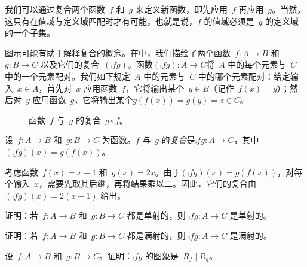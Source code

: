 \documentclass[../../../include/open-logic-section]{subfiles}
\begin{document}

\begin{explain}
我们可以通过复合两个函数~$f$ 和~$g$ 来定义新函数，即先应用~$f$ 再应用~$g$。当然，这只有在值域与定义域匹配时才有可能，也就是说，$f$ 的值域必须是~$g$ 的定义域的一个子集。

图示可能有助于解释复合的概念。在中，我们描绘了两个函数~$f \colon A \to B$ 和~$g \colon B \to C$ 以及它们的复合~$(\comp{f}{g})$。函数$(\comp{f}{g}) \colon A \to C$将~$A$ 中的每个元素与~$C$ 中的一个元素配对。我们如下规定~$A$ 中的元素与~$C$ 中的哪个元素配对：给定输入~$x \in A$，首先对~$x$ 应用函数~$f$，它将输出某个~$y \in B$（记作~$f(x) = y$）；然后对~$y$ 应用函数~$g$，它将输出某个$g(f(x)) = g(y) = z \in C$。
\begin{figure}
  \caption{函数~$f$ 与~$g$ 的复合~$g \circ f$。}
\end{figure}
\end{explain}

\begin{defn}[复合]
设~$f\colon A \to B$ 和~$g\colon B \to C$ 为函数。$f$ 与~$g$ 的\emph{复合}是$\comp{f}{g} \colon A \to C$，其中$(\comp{f}{g})(x) = g(f(x))$。
\end{defn}

\begin{ex}
考虑函数~$f(x) = x + 1$ 和~$g(x) = 2x$。由于$(\comp{f}{g})(x) = g(f(x))$，对每个输入~$x$，需要先取其后继，再将结果乘以二。因此，它们的复合由 $(\comp{f}{g})(x) = 2(x+1)$ 给出。
\end{ex}

\begin{prob}
证明：若~$f \colon A \to B$ 和~$g \colon B \to C$ 都是单射的，则 $\comp{f}{g}\colon A \to C$ 是单射的。
\end{prob}

\begin{prob}
证明：若~$f \colon A \to B$ 和~$g \colon B \to C$ 都是满射的，则 $\comp{f}{g}\colon A \to C$ 是满射的。
\end{prob}

\begin{prob}
设~$f \colon A \to B$ 和~$g \colon B \to C$。证明：$\comp{f}{g}$ 的图象是~$R_f \mid R_g$。
\end{prob}
\end{document}

